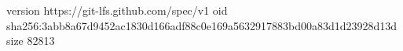 version https://git-lfs.github.com/spec/v1
oid sha256:3abb8a67d9452ac1830d166adf88c0e169a5632917883bd00a83d1d23928d13d
size 82813
